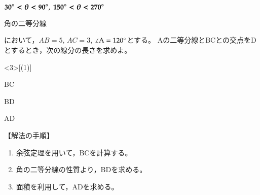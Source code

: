 \documentclass[a4j,fleqn]{jarticle}
\begin{document}
\begin{tyuukai}
\begin{enumerate}[(1)]
\begin{mawarikomi}[-3]{}
    $\boldsymbol{30^{\circ}<\theta<90^{\circ}},~\boldsymbol{150^{\circ}<\theta<270^{\circ}}$
    \end{mawarikomi}
\end{enumerate}
\end{tyuukai}

\tyuumark{$\blacktriangleleft$~}
\begin{itembox}{角の二等分線}
\begin{caprm}
において，$AB=5$, $AC=3$, $\kaku A=120\Deg$とする。
\kaku Aの二等分線とBCとの交点をDとするとき，次の線分の長さを求めよ。
\end{caprm}
\begin{edaenumerate}<3>[(1)]
  \item BC
  \item BD
  \item AD
\end{edaenumerate}
\end{itembox}\bigskip

\noindent 【解法の手順】\vspace{1ex}

\begin{small}
\begin{breakDbox}
\begin{enumerate}[\protect\expandafter\fbox1]
  \item 余弦定理を用いて，BCを計算する。
  \item 角の二等分線の性質より，BDを求める。
  \item 面積を利用して，ADを求める。
\end{enumerate}
\end{breakDbox}
\end{small}\bigskip
\end{document}
